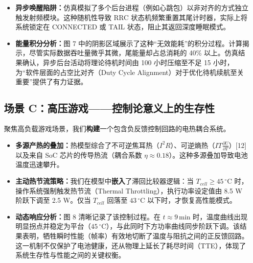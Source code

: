 \documentclass[11pt,a4paper]{ctexart}
\begin{document}
\begin{itemize}[leftmargin=1.6em,itemsep=0.4em]
\item \textbf{异步唤醒陷阱：}仿真模拟了多个后台进程（例如心跳包）以非对齐的方式独立触发射频模块。这种随机性导致 RRC 状态机频繁重置其尾计时器，实际上将系统锁定在 CONNECTED 或 TAIL 状态，阻止其返回深度睡眠模式。

\item \textbf{能量积分分析：}图 7 中的阴影区域展示了这种“无效能耗”的积分过程。计算揭示，尽管实际数据吞吐量微乎其微，尾能量却占总消耗的 40\% 以上。仿真结果确认，异步后台活动将理论待机时间由 100 小时压缩至不足 15 小时，为“软件层面的占空比对齐（Duty Cycle Alignment）对于优化待机续航至关重要”提供了有力证据。
\end{itemize}

\subsection{场景 C：高压游戏——控制论意义上的生存性}

聚焦高负载游戏场景，我们\textbf{构建}一个包含负反馈控制回路的电热耦合系统。

\begin{itemize}[leftmargin=1.6em,itemsep=0.4em]
\item \textbf{多源产热的叠加：}热模型综合了不可逆焦耳热（$I^2R$）、可逆熵热（$IT\frac{\partial U}{\partial T}$）[12] 以及来自 SoC 芯片的传导热流（耦合系数 $\eta \approx 0.18$）。这种多源叠加导致电池温度迅速攀升。

\item \textbf{主动热节流策略：}我们在模型中\textbf{嵌入}了滞回比较器逻辑：当 $T_{cell} \ge 45\,^{\circ}\mathrm{C}$ 时，操作系统强制触发热节流（Thermal Throttling），执行功率设定值由 8.5 W 阶跃下调至 2.5 W。仅当 $T_{cell}$ 回落至 $43\,^{\circ}\mathrm{C}$ 以下时，才恢复高性能模式。

\end{itemize}

\begin{itemize}[leftmargin=1.6em,itemsep=0.4em]
\item \textbf{动态响应分析：}图 8 清晰记录了该控制过程。在 $t \approx 9\,\mathrm{min}$ 时，温度曲线出现明显拐点并稳定为平台（$45\,^{\circ}\mathrm{C}$），与此同时下方功率曲线同步阶跃下调。该结果表明，牺牲瞬时性能（帧率）有效地切断了温度与阻抗之间的正反馈回路。这一机制不仅保护了电池健康，还从物理上延长了耗尽时间（TTE），体现了系统生存性与性能之间的关键权衡。
\end{itemize}
\end{document}
